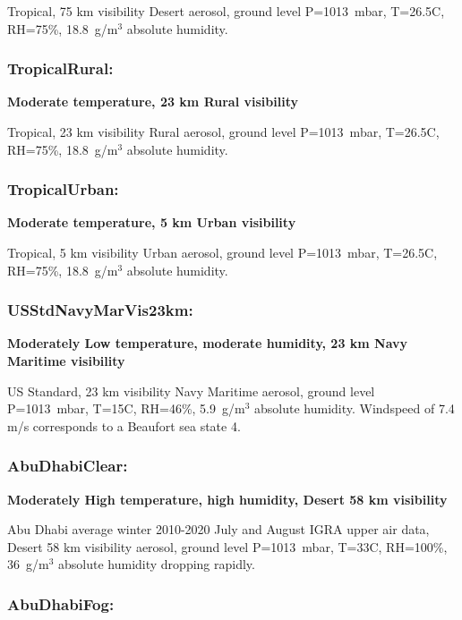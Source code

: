 \documentclass{workpackage}
\begin{document}
Tropical, 75 km visibility  Desert aerosol, ground level P=1013~mbar, T=26.5C, RH=75\%, 18.8~g/m$^3$ absolute humidity.

\subsubsection{TropicalRural:}
\label{sec:TropicalRural}

\textbf{Moderate temperature, 23 km Rural visibility}

Tropical, 23 km visibility  Rural aerosol, ground level P=1013~mbar, T=26.5C, RH=75\%, 18.8~g/m$^3$ absolute humidity.

\subsubsection{TropicalUrban:}
\label{sec:TropicalUrban}

\textbf{Moderate temperature, 5 km Urban visibility}

Tropical, 5 km visibility  Urban aerosol, ground level P=1013~mbar, T=26.5C, RH=75\%, 18.8~g/m$^3$ absolute humidity.


\subsubsection{USStdNavyMarVis23km:}
\label{sec:USStdNavyMarVis23km}

\textbf{Moderately Low temperature, moderate humidity, 23 km Navy Maritime visibility}

US Standard, 23 km visibility  Navy Maritime aerosol, ground level P=1013~mbar, T=15C, RH=46\%, 5.9~g/m$^3$ absolute humidity.  Windspeed of 7.4 m/s corresponds to a Beaufort sea state 4.




\subsubsection{AbuDhabiClear:}
\label{sec:AbuDhabiClear}

\textbf{Moderately High temperature, high humidity, Desert 58 km visibility }

Abu Dhabi average winter 2010-2020 July and August IGRA upper air data, 
Desert 58 km visibility aerosol, ground level P=1013~mbar, T=33C, RH=100\%, 36~g/m$^3$ absolute humidity dropping rapidly. 


\subsubsection{AbuDhabiFog:}
\label{sec:AbuDhabiFog}
\end{document}
